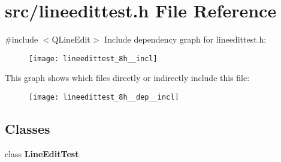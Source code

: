 \section{src/lineedittest.h File Reference}
\label{lineedittest_8h}
{\ttfamily \#include $<$Q\+Line\+Edit$>$}\newline
Include dependency graph for lineedittest.\+h\+:\nopagebreak
\begin{figure}[H]
\begin{center}
\leavevmode
\texttt{[image: lineedittest\_8h\_\_incl]}
\end{center}
\end{figure}
This graph shows which files directly or indirectly include this file\+:\nopagebreak
\begin{figure}[H]
\begin{center}
\leavevmode
\texttt{[image: lineedittest\_8h\_\_dep\_\_incl]}
\end{center}
\end{figure}
\subsection*{Classes}
\begin{DoxyCompactItemize}
\item 
class \textbf{ Line\+Edit\+Test}
\end{DoxyCompactItemize}
